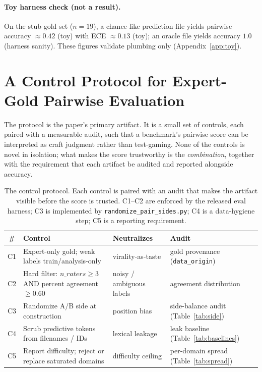 \documentclass[11pt,a4paper]{article}
\begin{document}
\paragraph{Toy harness check (not a result).} On the stub gold set ($n=19$), a chance-like prediction file yields pairwise accuracy $\approx 0.42$ (toy) with ECE $\approx 0.13$ (toy); an oracle file yields accuracy $1.0$ (harness sanity). These figures validate plumbing only (Appendix~\ref{app:toy}).

\section{A Control Protocol for Expert-Gold Pairwise Evaluation}
\label{sec:control}

The protocol is the paper's primary artifact. It is a small set of controls, each paired with a measurable audit, such that a benchmark's pairwise score can be interpreted as craft judgment rather than test-gaming. None of the controls is novel in isolation; what makes the score trustworthy is the \emph{combination}, together with the requirement that each artifact be audited and reported alongside accuracy.

\begin{table}[t]
\centering
\small
\begin{tabular}{@{}cp{3.3cm}p{2.5cm}p{3.5cm}@{}}
\toprule
\# & Control & Neutralizes & Audit \\
\midrule
C1 & Expert-only gold; weak labels train/analysis-only & virality-as-taste & gold provenance (\texttt{data\_origin}) \\
C2 & Hard filter: $n\_raters \ge 3$ AND percent agreement $\ge 0.60$ & noisy / ambiguous labels & agreement distribution \\
C3 & Randomize A/B side at construction & position bias & side-balance audit (Table~\ref{tab:side}) \\
C4 & Scrub predictive tokens from filenames / IDs & lexical leakage & leak baseline (Table~\ref{tab:baselines}) \\
C5 & Report difficulty; reject or replace saturated domains & difficulty ceiling & per-domain spread (Table~\ref{tab:spread}) \\
\bottomrule
\end{tabular}
\caption{The control protocol. Each control is paired with an audit that makes the artifact visible before the score is trusted. C1--C2 are enforced by the released eval harness; C3 is implemented by \texttt{randomize\_pair\_sides.py}; C4 is a data-hygiene step; C5 is a reporting requirement.}
\label{tab:tcp}
\end{table}
\end{document}
